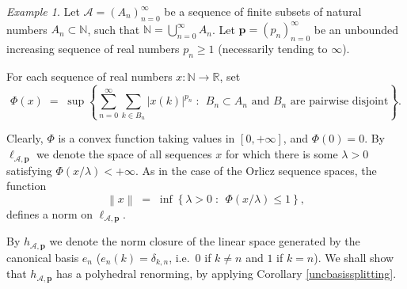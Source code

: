 \documentclass[12pt,a4paper]{amsart}
\theoremstyle{definition}
\theoremstyle{remark}
\newtheorem{example}[theorem]{Example}
\newcommand{\dset}[2]{\left\{{#1} \;:\;\, {#2}\right\}}
\newcommand{\n}[1]{\ensuremath{\left\|{#1}\right\|}}
\newcommand{\N}{\mathbb{N}}
\newcommand{\R}{\mathbb{R}}
\newcommand{\set}[2]{\{{#1} \;:\;\, {#2}\}}
\begin{document}
\begin{example}\label{new-example}
Let $\mathcal{A}=(A_n)_{n=0}^{\infty}$ be a sequence of finite
subsets of natural numbers $A_n \subset \N$, such that $\N =
\bigcup_{n=0}^{\infty}A_n$. Let $\mathbf{p} = \left(p_n\right)_{n=0}^{\infty}$
be an unbounded increasing sequence of real numbers $p_n \geq 1$
(necessarily tending to $\infty$). %

For each sequence of real numbers $x:\N \to \R$, set
\[
\Phi(x) \;=\; \sup\dset{\sum_{n=0}^{\infty} \sum_{k\in B_n}
|x(k)|^{p_n}}{B_n\subset A_n \text{ and } B_n \text{ are pairwise disjoint}}.
\]

Clearly, $\Phi$ is a convex function taking values in $[0,+\infty]$, and $\Phi(0)=0$.
By $\ell_{\mathcal{A},\mathbf{p}}$ we denote the space of all
sequences $x$ for which there is some $\lambda >0$ satisfying
$\Phi( x / \lambda) < +\infty$. As in the case of the Orlicz
sequence spaces, the function
\[
\n{x} \;=\; \inf\dset{\lambda>0}{\Phi( x / \lambda) \leq 1},
\]
defines a norm on $\ell_{\mathcal{A},\mathbf{p}}$.

By $h_{\mathcal{A},\mathbf{p}}$ we denote the norm closure of
the linear space generated by the canonical basis $e_n$
($e_n(k) = \delta_{k,n}$, i.e.\ $0$ if $k\neq n$ and $1$ if
$k=n$). We shall show that $h_{\mathcal{A},\mathbf{p}}$
has a polyhedral renorming, by applying Corollary
\ref{uncbasissplitting}.
\end{example}
\end{document}
